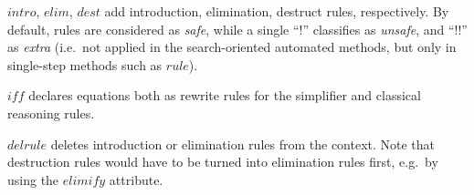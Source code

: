 \begin{descr}
\item [$intro$, $elim$, $dest$] add introduction, elimination, destruct rules,
  respectively.  By default, rules are considered as \emph{safe}, while a
  single ``!'' classifies as \emph{unsafe}, and ``!!'' as \emph{extra} (i.e.\ 
  not applied in the search-oriented automated methods, but only in
  single-step methods such as $rule$).
  
\item [$iff$] declares equations both as rewrite rules for the simplifier and
  classical reasoning rules.

\item [$delrule$] deletes introduction or elimination rules from the context.
  Note that destruction rules would have to be turned into elimination rules
  first, e.g.\ by using the $elimify$ attribute.
\end{descr}

